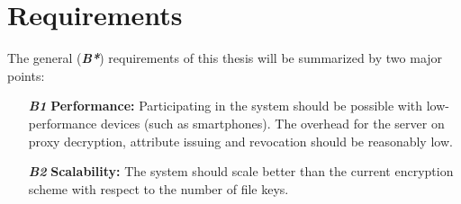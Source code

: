 \section{Requirements}
\label{sec:requirements}
The general (\textbf{\textit{B*}}) requirements of this thesis will be summarized by two major points: 

\begin{itemize}
	\item[\textit{\textbf{B1}}] \textbf{Performance:} Participating in the system should be possible with low-performance devices (such as smartphones). The overhead for the server on proxy decryption, attribute issuing and revocation should be reasonably low.  
	\item[\textit{\textbf{B2}}] \textbf{Scalability:} The system should scale better than the current encryption scheme with respect to the number of file keys. 
\end{itemize}

